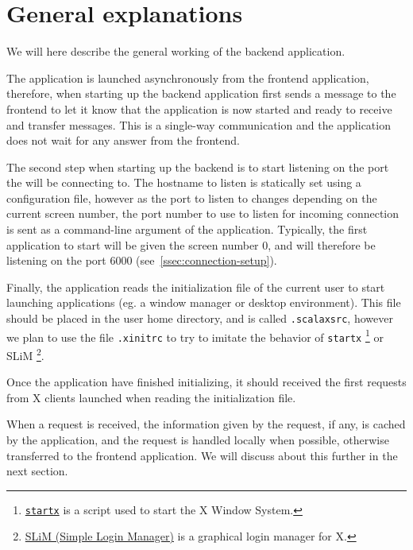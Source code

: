 \section{General explanations}
%
We will here describe the general working of the backend application.

The application is launched asynchronously from the frontend application, 
therefore, when starting up the backend application first sends a message to 
the frontend to let it know that the application is now started and ready to 
receive and transfer messages. This is a single-way communication and the 
application does not wait for any answer from the frontend.

The second step when starting up the backend is to start listening on the 
port the  will be connecting to. The hostname 
to listen is statically set using a configuration file, however as the port 
to listen to changes depending on the current screen number, the port number to 
use to listen for incoming connection is sent as a command-line argument of the 
application. Typically, the first application to start will be given the 
screen number $0$, and will therefore be listening on the port $6000$ 
(see~\ref{ssec:connection-setup}).

Finally, the application reads the initialization file of the current user 
to start launching applications (eg. a window manager or desktop environment). 
This file should be placed in the user home directory, and is called 
\lstinline{.scalaxsrc}, however we plan to use the file \lstinline{.xinitrc} to 
try to imitate the behavior of \lstinline{startx}
\footnote{\href{http://linux.die.net/man/1/startx}{\lstinline{startx}} is a script used to start the X Window System.}
or SLiM
\footnote{\href{http://slim.berlios.de/}{SLiM (Simple Login Manager)} is a graphical login manager for X.}.

Once the application have finished initializing, it should received the first requests 
from X clients launched when reading the initialization file.

When a request is received, the information given by the request, if any, is cached 
by the application, and the request is handled locally when possible, otherwise 
transferred to the frontend application. We will discuss about this further in the next 
section.
